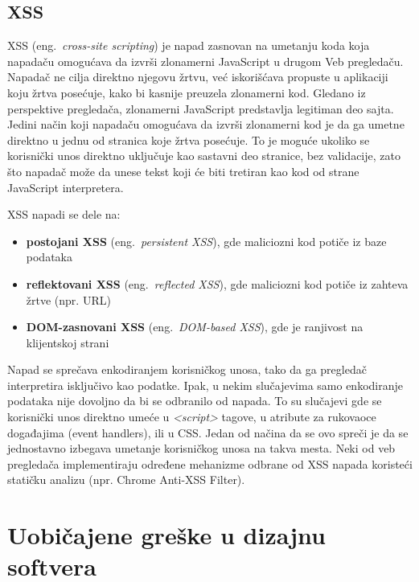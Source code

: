 \documentclass[a4paper]{article}
\begin{document}
\subsection{XSS}
\label{subsec:xss}
XSS (eng.~{\em cross-site scripting}) je napad zasnovan na umetanju koda koja napadaču omogućava da izvrši zlonamerni JavaScript u drugom Veb pregledaču. Napadač ne cilja direktno njegovu žrtvu, već iskorišćava propuste u aplikaciji koju žrtva posećuje, kako bi kasnije preuzela zlonamerni kod. Gledano iz perspektive pregledača, zlonamerni JavaScript predstavlja legitiman deo sajta. Jedini način koji napadaču omogućava da izvrši zlonamerni kod je da ga umetne direktno u jednu od stranica koje žrtva posećuje. To je moguće ukoliko se korisnički unos direktno uključuje kao sastavni deo stranice, bez validacije, zato što napadač može da unese tekst koji će biti tretiran kao kod od strane JavaScript interpretera.

XSS napadi se dele na:
\begin{itemize}
\item \textbf{postojani XSS} (eng.~{\em persistent XSS}), gde maliciozni kod potiče iz baze podataka
\item \textbf{reflektovani XSS} (eng.~{\em reflected XSS}), gde maliciozni kod potiče iz zahteva žrtve (npr. URL)
\item \textbf{DOM-zasnovani XSS} (eng.~{\em DOM-based XSS}), gde je ranjivost na klijentskoj strani
\end{itemize}

Napad se sprečava enkodiranjem korisničkog unosa, tako da ga pregledač interpretira isključivo kao podatke. Ipak, u nekim slučajevima samo enkodiranje podataka nije dovoljno da bi se odbranilo od napada. To su slučajevi gde se korisnički unos direktno umeće u \textit{<script>} tagove, u atribute za rukovaoce događajima (event handlers), ili u CSS. Jedan od načina da se ovo spreči je da se jednostavno izbegava umetanje korisničkog unosa na takva mesta. Neki od veb pregledača implementiraju određene mehanizme odbrane od XSS napada koristeći statičku analizu (npr. Chrome Anti-XSS Filter).

\section{Uobičajene greške u dizajnu softvera}
\label{sec:uobicajene greske u dizajnu softvera}
\end{document}
